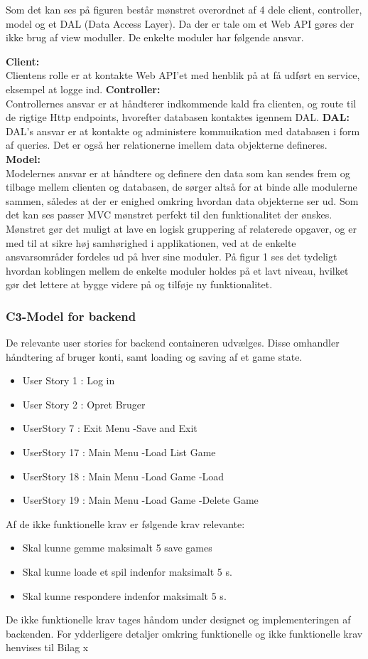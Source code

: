 Som det kan ses på figuren består mønstret overordnet af 4 dele client, controller, model og et DAL (Data Access Layer). Da der er tale om et Web API gøres der ikke brug af view moduller. De enkelte moduler har følgende ansvar.

\textbf{Client:}\\
Clientens rolle er at kontakte Web API’et med henblik på at få udført en service, eksempel at logge ind.
\textbf{Controller:}\\
Controllernes ansvar er at håndterer indkommende kald fra clienten, og route til de rigtige Http endpoints, hvorefter databasen kontaktes igennem DAL.
\textbf{DAL:}\\
DAL’s ansvar er at kontakte og administere kommuikation med databasen i form af queries. Det er også her relationerne imellem data objekterne defineres.
\textbf{Model:}\\
Modelernes ansvar er at håndtere og definere den data som kan sendes frem og tilbage mellem clienten og databasen, de sørger altså for at binde alle modulerne sammen, således at der er enighed omkring hvordan data objekterne ser ud.
Som det kan ses passer MVC mønstret perfekt til den funktionalitet der ønskes. Mønstret gør det muligt at lave en logisk gruppering af relaterede opgaver, og er med til at sikre høj samhørighed i applikationen, ved at de enkelte ansvarsområder fordeles ud på hver sine moduler. På figur 1 ses det tydeligt hvordan koblingen mellem de enkelte moduler holdes på et lavt niveau, hvilket gør det lettere at bygge videre på og tilføje ny funktionalitet.

\subsubsection{C3-Model for backend}

De relevante user stories for backend containeren udvælges. Disse omhandler håndtering af bruger konti, samt loading og saving af et game state.
 
\begin{itemize}
\item User Story 1 : Log in
\item User Story 2 : Opret Bruger
\item UserStory 7 : Exit Menu -\g Save and Exit
\item UserStory 17 : Main Menu -\g Load List Game
\item UserStory 18 : Main Menu -\g Load Game -\g Load
\item UserStory 19 : Main Menu -\g Load Game -\g Delete Game
\end{itemize}
Af de ikke funktionelle krav er følgende krav relevante:
\begin{itemize}
\item Skal kunne gemme maksimalt 5 save games
\item Skal kunne loade et spil indenfor maksimalt 5 s.
\item Skal kunne respondere indenfor maksimalt 5 s.
\end{itemize}
De ikke funktionelle krav tages håndom under designet og implementeringen af backenden.
For ydderligere detaljer omkring funktionelle og ikke funktionelle krav henvises til Bilag x


